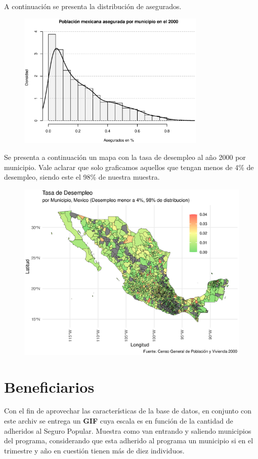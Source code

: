 \documentclass[9pt]{article}
\begin{document}
 A continuaci\'on se presenta la distribuci\'on de asegurados.
 \begin{figure}[H]
     \centering
     \includegraphics[width=0.8\textwidth]{figs/histinsured.eps}
 \end{figure}
\newpage
Se presenta a continuaci\'on un mapa con la tasa de desempleo al a\~no 2000 por municipio. Vale aclarar que solo graficamos aquellos que tengan menos de 4\% de desempleo, siendo este el 98\% de nuestra muestra.

 \begin{figure}[H]
     \centering
     \includegraphics[width=\textwidth]{figs/unemployement.eps}
 \end{figure}
\newpage
\section*{Beneficiarios}
Con el fin de aprovechar las caracter\'isticas de la base de datos, en conjunto con este archiv se entrega un \textbf{GIF} cuya escala es en funci\'on de la cantidad de adheridos al Seguro Popular. Muestra como van entrando y saliendo municipios del programa, considerando que esta adherido al programa un municipio si en el trimestre y a\~no en cuesti\'on tienen m\'as de diez individuos. 
\end{document}
